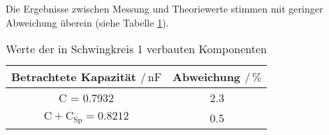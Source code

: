 Die Ergebnisse zwischen Messung und Theoriewerte stimmen mit geringer Abweichung
überein (siehe Tabelle \ref{tab:abweichung_schaltung1}).
\begin{table}
    \centering
    \caption{Werte der in Schwingkreis 1 verbauten Komponenten}
    \label{tab:abweichung_schaltung1}
    \begin{tabular}{c c}
        \toprule
        {Betrachtete Kapazität $\mathbin{/} \, \unit{\nano\farad}$} &
        {Abweichung $\mathbin{/} \, \unit{\percent}$} \\
        \midrule
        C = 0.7932                                   & 2.3  \\
        $\text{C} + \text{C}_{\text{Sp}} = 0.8212$   & 0.5  \\
        \bottomrule
    \end{tabular}
\end{table}
